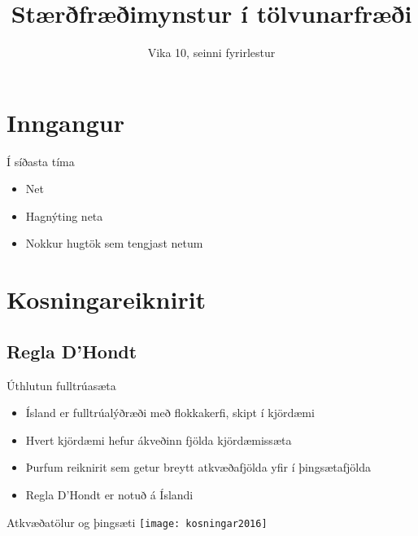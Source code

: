 \documentclass{beamer}
\title{Stærðfræðimynstur í tölvunarfræði}
\subtitle{Vika 10, seinni fyrirlestur}
\begin{document}
\begin{frame}
\titlepage
\end{frame}

\section{Inngangur}

\begin{frame}{Í síðasta tíma}
\begin{itemize}
 \item Net
 \item Hagnýting neta
 \item Nokkur hugtök sem tengjast netum
\end{itemize}
\end{frame}

\section{Kosningareiknirit}

\subsection{Regla D'Hondt}

\begin{frame}{Úthlutun fulltrúasæta}
    \begin{itemize}
        \item Ísland er fulltrúalýðræði með flokkakerfi, skipt í kjördæmi
        \item Hvert kjördæmi hefur ákveðinn fjölda kjördæmissæta
        \item Þurfum reiknirit sem getur breytt atkvæðafjölda yfir í þingsætafjölda
        \item Regla D'Hondt er notuð á Íslandi
    \end{itemize}
\end{frame}

\begin{frame}{Atkvæðatölur og þingsæti}
    \texttt{[image: kosningar2016]}
\end{frame}
\end{document}
